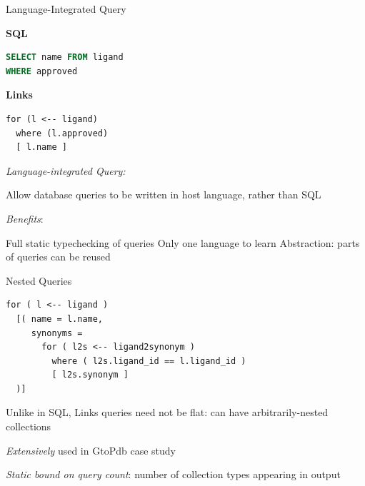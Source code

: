 \documentclass[11.5pt, aspectratio=169]{beamer}
\begin{document}
\begin{frame}[fragile]{Language-Integrated Query}

  \begin{minipage}[t]{0.45\textwidth}
    {\large \textbf{SQL}}
    \begin{lstlisting}[language=sql]
SELECT name FROM ligand
WHERE approved
    \end{lstlisting}
  \end{minipage}
  \hfill
  \begin{minipage}[t]{0.45\textwidth}
    {\large \textbf{Links}}
    \begin{lstlisting}[language=Links]
for (l <-- ligand)
  where (l.approved)
  [ l.name ]
    \end{lstlisting}
  \end{minipage}

  \begin{fullpageitemize}
  \item {\Large \emph{Language-integrated Query:}}
    \begin{itemize}
      \itemR Allow database queries to be written in host language, rather than SQL
    \end{itemize}
    \vspace{1em}
    \item { \Large \emph{Benefits}:}
    \begin{itemize}
      \itemR Full static typechecking of queries
      \itemR Only one language to learn
      \itemR Abstraction: parts of queries can be reused
    \end{itemize}
  \end{fullpageitemize}
\end{frame}

\begin{frame}[fragile]{Nested Queries}

  \begin{lstlisting}[language=Links]
for ( l <-- ligand )
  [( name = l.name,
     synonyms =
       for ( l2s <-- ligand2synonym )
         where ( l2s.ligand_id == l.ligand_id )
         [ l2s.synonym ]
  )]
  \end{lstlisting}

  \begin{fullpageitemize}
    \item Unlike in SQL, Links queries need not be flat: can have arbitrarily-nested collections
    \item \emph{Extensively} used in GtoPdb case study
    \item \emph{Static bound on query count}: number of collection types appearing in output
  \end{fullpageitemize}

\end{frame}
\end{document}
